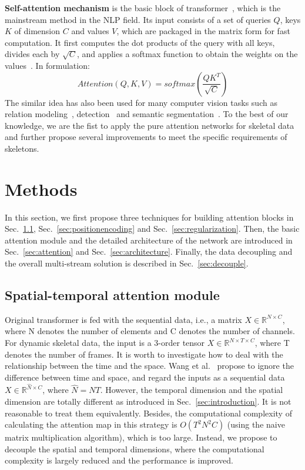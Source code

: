 \documentclass[runningheads]{llncs}
\begin{document}
\textbf{Self-attention mechanism} is the basic block of transformer~\cite{vaswani_attention_2017,dai_transformer-xl:_2019}, which is the mainstream method in the NLP field. 
Its input consists of a set of queries $Q$, keys $K$ of dimension $C$ and values $V$, which are packaged in the matrix form for fast computation. 
It first computes the dot products of the query with all keys, divides each by $\sqrt{C}$, and applies a softmax function to obtain the weights on the values~\cite{vaswani_attention_2017}. 
In formulation: 
\begin{equation}
    Attention(Q, K, V) = softmax(\frac{QK^T}{\sqrt{C}})
\end{equation}
The similar idea has also been used for many computer vision tasks such as relation modeling~\cite{santoro_simple_2017}, detection~\cite{hu_relation_2018} and semantic segmentation~\cite{fu_dual_2019}. 
To the best of our knowledge, we are the fist to apply the pure attention networks for skeletal data and further propose several improvements to meet the specific requirements of skeletons. 







\section{Methods}
In this section, we first propose three techniques for building attention blocks in Sec.~\ref{sec:strategies}, Sec.~\ref{sec:positionencoding} and Sec.~\ref{sec:regularization}. 
Then, the basic attention module and the detailed architecture of the network are introduced in Sec.~\ref{sec:attention} and Sec.~\ref{sec:architecture}. 
Finally, the data decoupling and the overall multi-stream solution is described in Sec.~\ref{sec:decouple}. 



\subsection{Spatial-temporal attention module}
\label{sec:strategies}
Original transformer is fed with the sequential data, i.e., a matrix $X\in\mathbb{R}^{N\times C}$, where N denotes the number of elements and C denotes the number of channels. 
For dynamic skeletal data, the input is a 3-order tensor $X\in\mathbb{R}^{N\times T\times C}$, where T denotes the number of frames. 
It is worth to investigate how to deal with the relationship between the time and the space. 
Wang et al.~\cite{wang_non-local_2018} propose to ignore the difference between time and space, and regard the inputs as a sequential data $X\in\mathbb{R}^{\hat{N}\times C}$, where $\hat{N}=NT$. 
However, the temporal dimension and the spatial dimension are totally different as introduced in Sec.~\ref{sec:introduction}.
It is not reasonable to treat them equivalently. 
Besides, the computational complexity of calculating the attention map in this strategy is $O(T^2N^2C)$ (using the naive matrix multiplication algorithm), which is too large. 
Instead, we propose to decouple the spatial and temporal dimensions, where the computational complexity is largely reduced and the performance is improved. 
\end{document}
